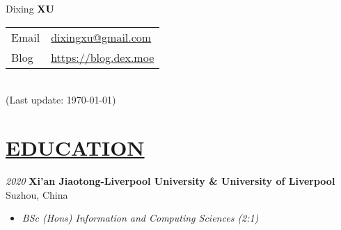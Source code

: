 \documentclass[11pt]{article}
\begin{document}
\begin{minipage}[t]{0.65\textwidth}
    {\Huge Dixing {\textbf{\textcolor{black}{XU}}}}
\end{minipage}
\begin{minipage}[t]{0.45\textwidth}
    {\small\raggedright
    \begin{tabular}{l@{: }l}
    Email & \href{mailto:dixingxu@gmail.com}{dixingxu@gmail.com} \\
    Blog & \href{https://blog.dex.moe}{https://blog.dex.moe} \\
    \end{tabular}\\
    (Last update: \today)
    }
\end{minipage}



%
\section*{\centering\underline{EDUCATION}}
\noindent\textit{2020} \large\textbf{Xi'an Jiaotong-Liverpool University \& University of Liverpool} \hfill Suzhou, China
\begin{itemize}[noitemsep, nolistsep]
    \item[] \textit{BSc (Hons) Information and Computing Sciences (2:1)}
\end{itemize} 
\vspace{20mm} %
\end{document}
